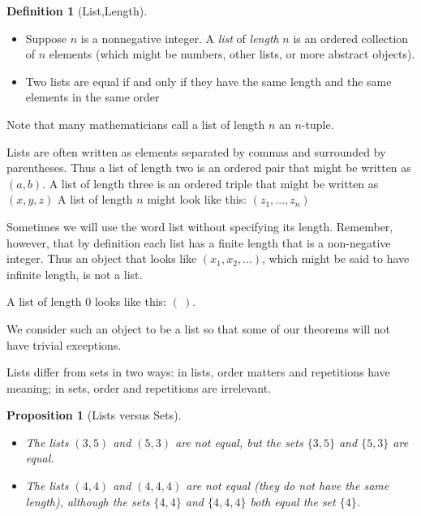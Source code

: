 \documentclass[
]{book}
\providecommand{\tightlist}{%
  \setlength{\itemsep}{0pt}\setlength{\parskip}{0pt}}
\newtheorem{proposition}{Proposition}[chapter]
\theoremstyle{definition}
\newtheorem{definition}{Definition}[chapter]
\theoremstyle{definition}
\theoremstyle{definition}
\theoremstyle{definition}
\theoremstyle{remark}
\begin{document}
\begin{definition}[List,Length]
\protect\hypertarget{def:unnamed-chunk-7}{}\label{def:unnamed-chunk-7}\leavevmode

\begin{itemize}
\tightlist
\item
  Suppose \(n\) is a nonnegative integer. A \emph{list} of \emph{length} \(n\) is an ordered collection of \(n\) elements (which might be numbers, other lists, or more abstract objects).
\item
  Two lists are equal if and only if they have the same length and the same elements in the same order
\end{itemize}

Note that many mathematicians call a list of length \(n\) an \(n\)-tuple.

\end{definition}

Lists are often written as elements separated by commas and surrounded by parentheses. Thus a list of length two is an ordered pair that might be written as \((a,b)\). A list of length three is an ordered triple that might be written as \((x,y,z)\) A list of length \(n\) might look like this: \((z_1,...,z_n)\)

Sometimes we will use the word list without specifying its length. Remember, however, that by definition each list has a finite length that is a non-negative integer. Thus an object that looks like \((x_1, x_2, ... )\), which might be said to have infinite length, is not a list.

A list of length 0 looks like this: \((~)\).

We consider such an object to be a list so that some of our theorems will not have trivial exceptions.

Lists differ from sets in two ways: in lists, order matters and repetitions have meaning; in sets, order and repetitions are irrelevant.

\begin{proposition}[Lists versus Sets]
\protect\hypertarget{prp:unnamed-chunk-8}{}\label{prp:unnamed-chunk-8}\leavevmode

\begin{itemize}
\tightlist
\item
  The lists \((3, 5)\) and \((5, 3)\) are not equal, but the sets \(\{3, 5\}\) and \(\{5, 3\}\) are equal.
\item
  The lists \((4, 4)\) and \((4, 4, 4)\) are not equal (they do not have the same length), although the sets \(\{4, 4\}\) and \(\{4, 4, 4\}\) both equal the set \(\{4\}\).
\end{itemize}

\end{proposition}
\end{document}
